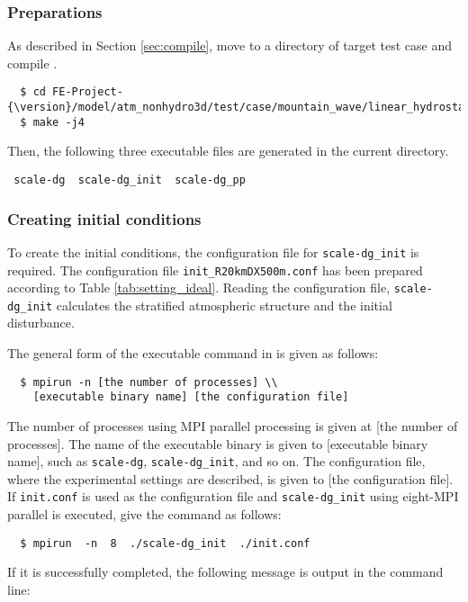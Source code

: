 \subsubsection{Preparations} %

As described in Section \ref{sec:compile},
move to a directory of target test case and compile \scaledg. 
\begin{verbatim}
  $ cd FE-Project-{\version}/model/atm_nonhydro3d/test/case/mountain_wave/linear_hydrostatic_case
  $ make -j4
\end{verbatim}
Then, 
the following three executable files are generated in the current directory.
\begin{verbatim}
 scale-dg  scale-dg_init  scale-dg_pp
\end{verbatim}

\subsubsection{Creating initial conditions} \label{subsec:ideal_exp_init}

To create the initial conditions, the configuration file for \verb|scale-dg_init| is required.
The configuration file \verb|init_R20kmDX500m.conf| has been prepared
according to Table \ref{tab:setting_ideal}.
Reading the configuration file, \verb|scale-dg_init| calculates the stratified atmospheric structure and the initial disturbance.

The general form of the executable command in \scaledg is given as follows:
\begin{verbatim}
  $ mpirun -n [the number of processes] \\
    [executable binary name] [the configuration file]
\end{verbatim}
The number of processes using MPI parallel processing is given at [the number of processes]. 
The name of the executable binary is given to [executable binary name],  such as \verb|scale-dg|, \verb|scale-dg_init|, and so on.  
The configuration file, where the experimental settings are described, is given to [the configuration file].
If \verb|init.conf| is used as the configuration file and 
\verb|scale-dg_init| using eight-MPI parallel is executed, 
give the command as follows:
\begin{verbatim}
  $ mpirun  -n  8  ./scale-dg_init  ./init.conf
\end{verbatim}
\noindent
If it is successfully completed, 
the following message is output in the command line:

